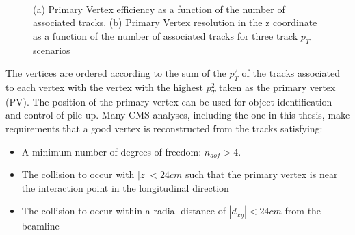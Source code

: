 \begin{figure}[hbt]
  \begin{center} 
   ~
   \caption{(a) Primary Vertex efficiency as a function of the number of associated tracks. (b) Primary Vertex 
   resolution in the z coordinate as a function of the number of associated tracks for three track $p_T$ scenarios \cite{tracker_seven}
   \label{fig:pvEffRes} }
  \end{center}
\end{figure}
The vertices are ordered according to the sum of the $p_T^2$ of the tracks associated to each vertex with the 
vertex with the highest $p_T^2$ taken as the primary vertex (PV). The position of the primary vertex can
be used for object identification and control of pile-up. Many CMS analyses, including the one in this 
thesis, make requirements that a good vertex is reconstructed from the tracks satisfying:

\begin{itemize}
\item A minimum number of degrees of freedom: $n_{dof} > 4$.
\item The collision to occur with $|z| < 24cm$ such that the primary vertex is near the interaction point in the longitudinal direction
\item The collision to occur within a radial distance of $|d_{xy}| < 24cm$ from the beamline 
\end{itemize}

